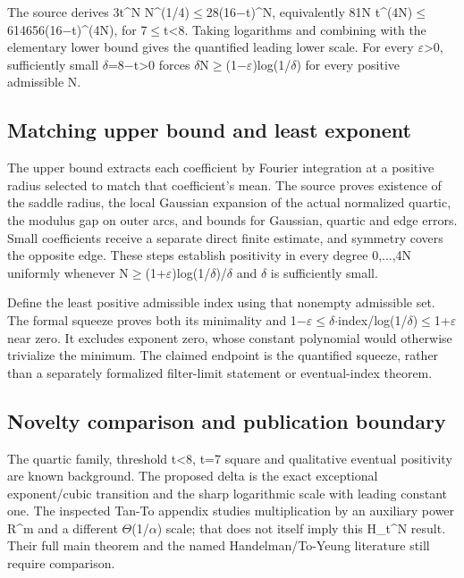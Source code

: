 \documentclass[11pt,a4paper]{article}
\begin{document}
The source derives 3t\textasciicircum{}N N\textasciicircum{}(1/4)\ensuremath{\leq}28(16\ensuremath{-}t)\textasciicircum{}N, equivalently 81N t\textasciicircum{}(4N)\ensuremath{\leq}614656(16\ensuremath{-}t)\textasciicircum{}(4N), for 7\ensuremath{\leq}t<8. Taking logarithms and combining with the elementary lower bound gives the quantified leading lower scale. For every \ensuremath{\varepsilon}>0, sufficiently small \ensuremath{\delta}=8\ensuremath{-}t>0 forces \ensuremath{\delta}N\ensuremath{\geq}(1\ensuremath{-}\ensuremath{\varepsilon})log(1/\ensuremath{\delta}) for every positive admissible N.

\subsection{Matching upper bound and least exponent}
The upper bound extracts each coefficient by Fourier integration at a positive radius selected to match that coefficient's mean. The source proves existence of the saddle radius, the local Gaussian expansion of the actual normalized quartic, the modulus gap on outer arcs, and bounds for Gaussian, quartic and edge errors. Small coefficients receive a separate direct finite estimate, and symmetry covers the opposite edge. These steps establish positivity in every degree 0,...,4N uniformly whenever N\ensuremath{\geq}(1+\ensuremath{\varepsilon})log(1/\ensuremath{\delta})/\ensuremath{\delta} and \ensuremath{\delta} is sufficiently small.

Define the least positive admissible index using that nonempty admissible set. The formal squeeze proves both its minimality and 1\ensuremath{-}\ensuremath{\varepsilon}\ensuremath{\leq}\ensuremath{\delta}\ensuremath{\cdot}index/log(1/\ensuremath{\delta})\ensuremath{\leq}1+\ensuremath{\varepsilon} near zero. It excludes exponent zero, whose constant polynomial would otherwise trivialize the minimum. The claimed endpoint is the quantified squeeze, rather than a separately formalized filter-limit statement or eventual-index theorem.

\subsection{Novelty comparison and publication boundary}
The quartic family, threshold t<8, t=7 square and qualitative eventual positivity are known background. The proposed delta is the exact exceptional exponent/cubic transition and the sharp logarithmic scale with leading constant one. The inspected Tan-To appendix studies multiplication by an auxiliary power R\textasciicircum{}m and a different \ensuremath{\Theta}(1/\ensuremath{\alpha}) scale; that does not itself imply this H\_t\textasciicircum{}N result. Their full main theorem and the named Handelman/To-Yeung literature still require comparison.
\end{document}
